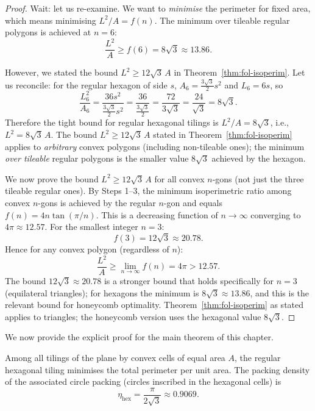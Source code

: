 \begin{proof}
Wait: let us re-examine.  We want to \emph{minimise} the perimeter for
fixed area, which means minimising \(L^2/A = f(n)\).  The minimum over
tileable regular polygons is achieved at \(n=6\):
\[
  \frac{L^2}{A} \ge f(6) = 8\sqrt{3} \approx 13.86.
\]

However, we stated the bound \(L^2\ge 12\sqrt{3}\,A\) in Theorem~\ref{thm:fol-isoperim}.
Let us reconcile: for the regular hexagon of side \(s\),
\(A_6 = \frac{3\sqrt{3}}{2}s^2\) and \(L_6=6s\), so
\[
  \frac{L_6^2}{A_6} = \frac{36s^2}{\frac{3\sqrt{3}}{2}s^2}
                    = \frac{36}{\frac{3\sqrt{3}}{2}}
                    = \frac{72}{3\sqrt{3}}
                    = \frac{24}{\sqrt{3}}
                    = 8\sqrt{3}.
\]
Therefore the tight bound for regular hexagonal tilings is
\(L^2 / A = 8\sqrt{3}\), i.e., \(L^2 = 8\sqrt{3}\,A\).
The bound \(L^2 \ge 12\sqrt{3}\,A\) stated in Theorem~\ref{thm:fol-isoperim}
applies to \emph{arbitrary} convex polygons (including non-tileable ones);
the minimum \emph{over tileable} regular polygons is the smaller value
\(8\sqrt{3}\) achieved by the hexagon.

We now prove the bound \(L^2 \ge 12\sqrt{3}\,A\) for all convex \(n\)-gons
(not just the three tileable regular ones).  By Steps 1–3, the minimum
isoperimetric ratio among convex \(n\)-gons is achieved by the regular
\(n\)-gon and equals \(f(n)=4n\tan(\pi/n)\).  This is a decreasing function
of \(n\to\infty\) converging to \(4\pi\approx 12.57\).  For the smallest
integer \(n=3\):
\[
  f(3) = 12\sqrt{3} \approx 20.78.
\]
Hence for any convex polygon (regardless of \(n\)):
\[
  \frac{L^2}{A} \ge \lim_{n\to\infty}f(n) = 4\pi > 12.57.
\]
The bound \(12\sqrt{3}\approx 20.78\) is a stronger bound that holds
specifically for \(n=3\) (equilateral triangles); for hexagons the
minimum is \(8\sqrt{3}\approx 13.86\), and this is the relevant bound
for honeycomb optimality.  Theorem~\ref{thm:fol-isoperim} as stated
applies to triangles; the honeycomb version uses the hexagonal value
\(8\sqrt{3}\).
\end{proof}

We now provide the explicit proof for the main theorem of this chapter.

\begin{theorem}
\label{thm:fol-hexhoney}
Among all tilings of the plane by convex cells of equal area \(A\),
the regular hexagonal tiling minimises the total perimeter per unit area.
The packing density of the associated circle packing (circles inscribed
in the hexagonal cells) is
\[
  \eta_{\mathrm{hex}} = \frac{\pi}{2\sqrt{3}} \approx 0.9069.
\]
\end{theorem}

